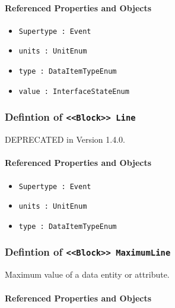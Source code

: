 \FloatBarrier
\paragraph{Referenced Properties and Objects}

\begin{itemize}
\item \texttt{Supertype : Event}

\item \texttt{units : UnitEnum}

\item \texttt{type : DataItemTypeEnum}

\item \texttt{value : InterfaceStateEnum}

\end{itemize}
\FloatBarrier
\subsubsection{Defintion of \texttt{<<Block>> Line}}
  \label{type:Line}

\FloatBarrier

DEPRECATED in Version 1.4.0.

\FloatBarrier
\paragraph{Referenced Properties and Objects}

\begin{itemize}
\item \texttt{Supertype : Event}

\item \texttt{units : UnitEnum}

\item \texttt{type : DataItemTypeEnum}

\end{itemize}
\FloatBarrier
\subsubsection{Defintion of \texttt{<<Block>> MaximumLine}}
  \label{type:MaximumLine}

\FloatBarrier

Maximum value of a data entity or attribute.

\FloatBarrier
\paragraph{Referenced Properties and Objects}

